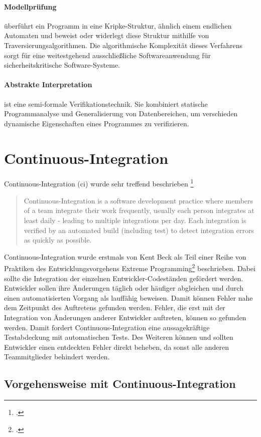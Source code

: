 \paragraph{Modellprüfung} überführt ein Programm in eine Kripke-Struktur, ähnlich einem endlichen Automaten und beweist oder widerlegt diese Struktur mithilfe von Traversierungsalgorithmen. Die algorithmische Komplexität dieses Verfahrens sorgt für eine weitestgehend ausschließliche Softwareanwendung für sicherheitskritische Software-Systeme.

\paragraph{Abstrakte Interpretation} ist eine semi-formale Verifikationstechnik. Sie kombiniert statische Programmanalyse und Generalisierung von Datenbereichen, um verschieden dynamische Eigenschaften eines Programmes zu verifizieren.

\section{Continuous-Integration}

Continuous-Integration (\acs{ci}) wurde sehr treffend beschrieben \footcite[vgl.][]{fowler2006}

\blockquote {Continuous-Integration is a software development practice where members of a team integrate their work frequently, usually each person integrates at least daily - leading to multiple integrations per day. Each integration is verified by an automated build (including test) to detect integration errors as quickly as possible.}

Continuous-Integration wurde erstmals von Kent Beck als Teil einer Reihe von Praktiken des Entwicklungsvorgehens \glqq Extreme Programming\grqq{}\footcite[vgl.][]{kent1999} beschrieben. Dabei sollte die Integration der einzelnen Entwickler-Codeständen gefördert werden. Entwickler sollen ihre Änderungen täglich oder häufiger abgleichen und durch einen automatisierten Vorgang als lauffähig beweisen. Damit können Fehler nahe dem Zeitpunkt des Auftretens gefunden werden. Fehler, die erst mit der Integration von Änderungen anderer Entwickler auftreten, können so gefunden werden. Damit fordert Continuous-Integration eine aussagekräftige Testabdeckung mit automatischen Tests. Des Weiteren können und sollten Entwickler einen entdeckten Fehler direkt beheben, da sonst alle anderen Teammitglieder behindert werden.

\subsection{Vorgehensweise mit Continuous-Integration}

